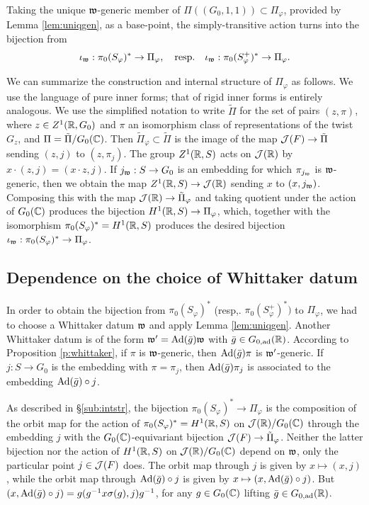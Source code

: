 \documentclass{article}
\theoremstyle{definition}
\numberwithin{equation}{section}
\renewcommand{\-}{\hyp{}}
\begin{document}
Taking the unique $\mathfrak{w}$-generic member of $\Pi((G_0,1,1)) \subset \Pi_\varphi$, provided by Lemma \ref{lem:uniqgen}, as a base-point, the simply-transitive action turns into the bijection from 
\[ \iota_{\mathfrak{w}} : \pi_0(S_\varphi)^* \to  \Pi_\varphi, \quad \textrm{resp.}\quad \iota_{\mathfrak{w}} : \pi_0(S_\varphi^+)^* \to \Pi_\varphi. \]

We can summarize the construction and internal structure of $\Pi_\varphi$ as follows. We use the language of pure inner forms; that of rigid inner forms is entirely analogous. We use the simplified notation to write $\tilde\Pi$ for the set of pairs $(z,\pi)$, where $z \in Z^1(\mathbb{R},G_0)$ and $\pi$ an isomorphism class of representations of the twist $G_z$, and $\Pi=\tilde\Pi/G_0(\mathbb{C})$. Then $\tilde\Pi_\varphi \subset \tilde\Pi$ is the image of the map $\mathcal{J}(F) \to \tilde\Pi$ sending $(z,j)$ to $(z,\pi_j)$. The group $Z^1(\mathbb{R},S)$ acts on $\mathcal{J}(\mathbb{R})$ by $x\cdot (z,j)=(x \cdot z,j)$. If $j_{\mathfrak{w}} : S \to G_0$ is an embedding for which $\pi_{j_{\mathfrak{w}}}$ is $\mathfrak{w}$-generic, then we obtain the map $Z^1(\mathbb{R},S) \to \mathcal{J}(\mathbb{R})$ sending $x$ to $(x,j_{\mathfrak{w}})$. Composing this with the map $\mathcal{J}(\mathbb{R}) \to \tilde\Pi_\varphi$ and taking quotient under the action of $G_0(\mathbb{C})$ produces the bijection $H^1(\mathbb{R},S) \to \Pi_\varphi$, which, together with the isomorphism $\pi_0(S_\varphi)^*=H^1(\mathbb{R},S)$ produces the desired bijection $\iota_{\mathfrak{w}} : \pi_0(S_\varphi)^* \to \Pi_\varphi$.

\subsection{Dependence on the choice of Whittaker datum} \label{sub:whitdep}

In order to obtain the bijection from $\pi_0(S_\varphi)^*$ (resp,. $\pi_0(S_\varphi^+)^*)$ to $\Pi_\varphi$, we had to choose a Whittaker datum $\mathfrak{w}$ and apply Lemma \ref{lem:uniqgen}. Another Whittaker datum is of the form $\mathfrak{w'}=\textrm{Ad}(\bar g)\mathfrak{w}$ with $\bar g \in G_{0,\textrm{ad}}(\mathbb{R})$. According to Proposition \ref{p:whittaker}, if $\pi$ is $\mathfrak{w}$-generic, then $\textrm{Ad}(\bar g)\pi$ is $\mathfrak{w'}$-generic. If $j : S \to G_0$ is the embedding with $\pi=\pi_j$, then $\textrm{Ad}(\bar g)\pi_j$ is associated to the embedding $\textrm{Ad}(\bar g)\circ j$.

As described in \S\ref{sub:intstr}, the bijection $\pi_0(S_\varphi)^* \to \Pi_\varphi$ is the composition of the orbit map for the action of $\pi_0(S_\varphi)^*=H^1(\mathbb{R},S)$ on $\mathcal{J}(\mathbb{R})/G_0(\mathbb{C})$ through the embedding $j$ with the $G_0(\mathbb{C})$-equivariant bijection $\mathcal{J}(F) \to \tilde\Pi_\varphi$. Neither the latter bijection nor the action of $H^1(\mathbb{R},S)$ on $\mathcal{J}(\mathbb{R})/G_0(\mathbb{C})$ depend on $\mathfrak{w}$, only the particular point $j \in \mathcal{J}(F)$ does. The orbit map through $j$ is given by $x \mapsto (x,j)$, while the orbit map through $\textrm{Ad}(\bar g)\circ j$ is given by $x \mapsto (x,\textrm{Ad}(\bar g)\circ j)$. But $(x,\textrm{Ad}(\bar g)\circ j)=g(g^{-1}x\sigma(g),j)g^{-1}$, for any $g \in G_0(\mathbb{C})$ lifting $\bar g \in G_{0,\textrm{ad}}(\mathbb{R})$.
\end{document}
